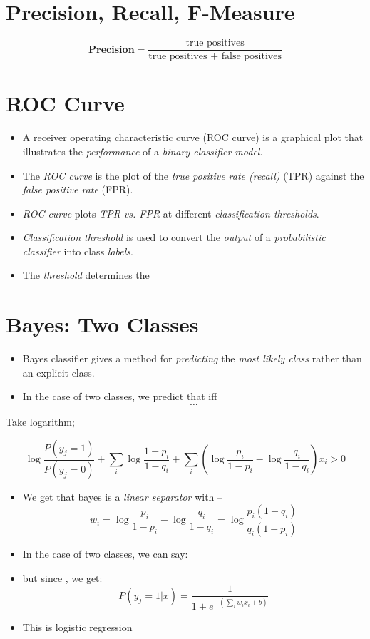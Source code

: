 \documentclass[
	number={3},
	title={Na\:ive Bayes Learning}
]{cs584notes}
\begin{document}
\section{Precision, Recall, F-Measure}\label{sec:precision-recall-f-measure}
\begin{equation}
	\mathbf{Precision} = \frac{\mbox{true positives}}{\mbox{true positives } + \mbox{ false positives}}
	\label{eq:precision}
\end{equation}

\section{ROC Curve}\label{sec:roc-curve}
\begin{itemize}
	\item A receiver operating characteristic curve (ROC curve) is a graphical plot that illustrates the \emph{performance} of a \emph{binary classifier model}.
	\item The \emph{ROC curve} is the plot of the \emph{true positive rate (recall)} (TPR) against the \emph{false positive rate} (FPR).
	\item \emph{ROC curve} plots \emph{TPR vs. FPR} at different \emph{classification thresholds}.
	\item \emph{Classification threshold} is used to convert the \emph{output} of a \emph{probabilistic classifier} into class \emph{labels}.
	\item The \emph{threshold} determines the
\end{itemize}

\section{\naive Bayes: Two Classes}\label{sec:naive-bayes:-two-classes}
\begin{itemize}
	\item \naive Bayes classifier gives a method for \emph{predicting} the \emph{most likely class} rather than an explicit class.
	\item In the case of two classes,  we predict that  iff
	\[ \dots \]
\end{itemize}

Take logarithm;

\[ \log \frac{P(y_{j}=1)}{P(y_{j}=0)} + \sum_{i}\log \frac{1-p_{i}}{1-q_{i}} + \sum_{i}\left( \log\frac{p_{i}}{1-p_{i}} - \log\frac{q_{i}}{1-q_{i}} \right)x_{i} > 0 \]
\begin{itemize}
	\item We get that \naive bayes is a \emph{linear separator} with --
	\[ w_{i} = \log\frac{p_{i}}{1 - p_{i}} - \log\frac{q_{i}}{1 - q_{i}} = \log\frac{p_{i}(1-q_{i})}{q_{i}(1-p_{i})} \]
	\item In the case of two classes, we can say:
	\item but since , we get:
	\[ P(y_{j}=1|x) = \frac{1}{1+e^{-\left( \sum_{i}w_{i}x_{i} + b \right)}} \]
	\item This is logistic regression
\end{itemize}
\end{document}
